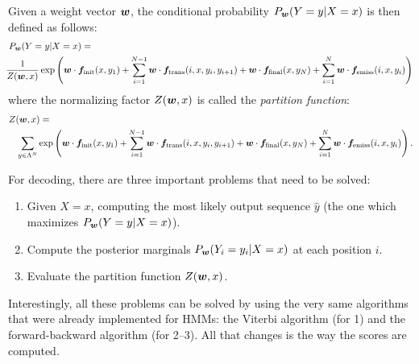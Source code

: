 %
Given a weight vector $\boldsymbol{w}$, the conditional probability $P_{\boldsymbol{w}}(Y=y|X=x)$ is then defined as follows: 
\begin{eqnarray}
\lefteqn{P_{\W}(Y=y|X=x) =}\nonumber\\
&&
\!\!\!\!\!\!\!\!\frac{1}{Z({\W},x)}\exp\left(\W \cdot \F_{\mathrm{init}}(x,y_1) + 
\sum_{i=1}^{N-1} \W \cdot \F_{\mathrm{trans}}(i,x,y_i,y_{i+1})
+
\W \cdot \F_{\mathrm{final}}(x,y_N)
+
\sum_{i=1}^{N} \W \cdot \F_{\mathrm{emiss}}(i,x,y_i)
\right) \label{eq:disc_formula}
\end{eqnarray}
where the normalizing factor $Z(\boldsymbol{w},x)$ is called the \emph{partition function}:
\begin{eqnarray}
\lefteqn{Z(\W,x) =}\nonumber\\ 
&& 
\sum_{y\in \statevocab^N} \exp\left(\W \cdot \F_{\mathrm{init}}(x,y_1) + 
\sum_{i=1}^{N-1} \W \cdot \F_{\mathrm{trans}}(i,x,y_i,y_{i+1})
+
\W \cdot \F_{\mathrm{final}}(x,y_N)
+
\sum_{i=1}^{N} \W \cdot \F_{\mathrm{emiss}}(i,x,y_i)
\right).
\end{eqnarray}

For decoding,  
there are three important problems that need to be solved: 
\begin{enumerate}
\item Given $X=x$, computing the most likely output sequence $\widehat{y}$ (the one which maximizes $P_{\boldsymbol{w}}(Y=y|X=x)$). 
\item Compute the posterior marginals $P_{\boldsymbol{w}}(Y_i=y_i|X=x)$ at each position $i$.
\item Evaluate the partition function $Z(\boldsymbol{w},x)$. 
\end{enumerate}
Interestingly, all these problems can be solved by using the very same
algorithms that were 
already implemented for HMMs: the Viterbi algorithm (for 1) and the forward-backward algorithm (for 2--3). All that changes is the way the scores are computed. 

